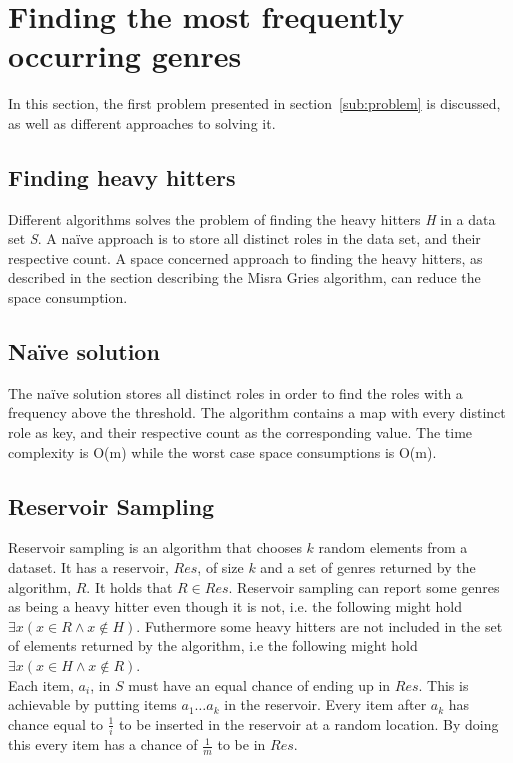 
\section{Finding the most frequently occurring genres}
In this section, the first problem presented in section~\ref{sub:problem} is discussed, as well as different approaches to solving it.
\cite{reservoir}

\subsection{Finding heavy hitters}
Different algorithms solves the problem of finding the heavy hitters \textit{H} in a data set \textit{S}. A naïve approach is to store all distinct roles in the data set, and their respective count. A space concerned approach to finding the heavy hitters, as described in the section describing the Misra Gries algorithm, can reduce the space consumption.

\subsection{Naïve solution}
The naïve solution stores all distinct roles in order to find the roles with a frequency above the threshold. The algorithm contains a map with every distinct role as key, and their respective count as the corresponding value. The time complexity is O(m) while the worst case space consumptions is O(m).

\subsection{Reservoir Sampling}
Reservoir sampling is an algorithm that chooses \(k\) random elements from a dataset. It has a reservoir, \(Res\), of size \(k\) and a set of genres returned by the algorithm, \(R\). It holds that \(R \in Res\). Reservoir sampling can report some genres as being a heavy hitter even though it is not, i.e. the following might hold \(\exists x \left(x \in R \land x \notin H \right)\). Futhermore some heavy hitters are not included in the set of elements returned by the algorithm, i.e the following might hold \(\exists x \left(x \in H \land x \notin R \right)\).\\

Each item, \(a_i\), in \(S\) must have an equal chance of ending up in \(Res\). This is achievable by putting items \(a_1 \dots a_k\) in the reservoir. Every item after \(a_k\) has chance equal to \(\frac{1}{i}\) to be inserted in the reservoir at a random location. By doing this every item has a chance of \(\frac{1}{m}\) to be in \(Res\).

